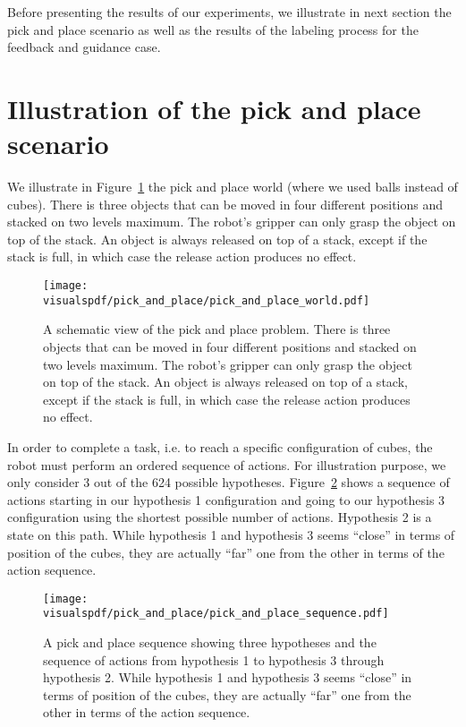 Before presenting the results of our experiments, we illustrate in next section the pick and place scenario as well as the results of the labeling process for the feedback and guidance case.

\section{Illustration of the pick and place scenario}
\label{appendix:pickplace}

We illustrate in Figure~\ref{fig:lfui:pickplaceworld} the pick and place world (where we used balls instead of cubes). There is three objects that can be moved in four different positions and stacked on two levels maximum. The robot's gripper can only grasp the object on top of the stack. An object is always released on top of a stack, except if the stack is full, in which case the release action produces no effect.

\begin{figure}[!htbp]
  \centering
  \texttt{[image: \\visualspdf/pick\_and\_place/pick\_and\_place\_world.pdf]}
  \caption{A schematic view of the pick and place problem. There is three objects that can be moved in four different positions and stacked on two levels maximum. The robot's gripper can only grasp the object on top of the stack. An object is always released on top of a stack, except if the stack is full, in which case the release action produces no effect.}
  \label{fig:lfui:pickplaceworld}
\end{figure}

In order to complete a task, i.e. to reach a specific configuration of cubes, the robot must perform an ordered sequence of actions. For illustration purpose, we only consider 3 out of the 624 possible hypotheses. Figure~\ref{fig:lfui:pickplacesequence} shows a sequence of actions starting in our hypothesis 1 configuration and going to our hypothesis 3 configuration using the shortest possible number of actions. Hypothesis 2 is a state on this path. While hypothesis 1 and hypothesis 3 seems ``close'' in terms of position of the cubes, they are actually ``far'' one from the other in terms of the action sequence.

\begin{figure}[!htbp]
  \centering
  \texttt{[image: \\visualspdf/pick\_and\_place/pick\_and\_place\_sequence.pdf]}
  \caption{A pick and place sequence showing three hypotheses and the sequence of actions from hypothesis 1 to hypothesis 3 through hypothesis 2. While hypothesis 1 and hypothesis 3 seems ``close'' in terms of position of the cubes, they are actually ``far'' one from the other in terms of the action sequence.}
  \label{fig:lfui:pickplacesequence}
\end{figure}

